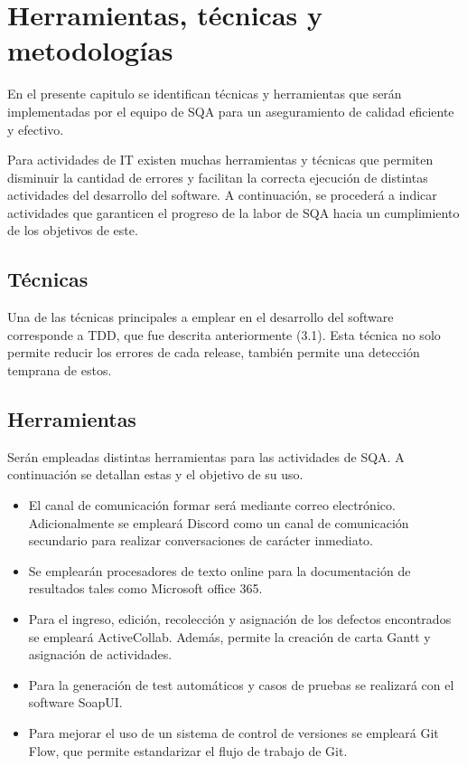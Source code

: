 
\chapter{Herramientas, técnicas y metodologías}

En el presente capitulo se identifican técnicas y herramientas que serán implementadas por el equipo de SQA para un aseguramiento de calidad eficiente y efectivo.

Para actividades de IT existen muchas herramientas y técnicas que permiten disminuir la cantidad de errores y facilitan la correcta ejecución de distintas actividades del desarrollo del software. A continuación, se procederá a indicar actividades que garanticen el progreso de la labor de SQA hacia un cumplimiento de los objetivos de este.

\section{Técnicas}

Una de las técnicas principales a emplear en el desarrollo del software corresponde a TDD, que fue descrita anteriormente (3.1). Esta técnica no solo permite reducir los errores de cada release, también permite una detección temprana de estos.

\section{Herramientas}

Serán empleadas distintas herramientas para las actividades de SQA. A continuación se detallan estas y el objetivo de su uso.

\begin{itemize}
	\item 
		El canal de comunicación formar será mediante correo electrónico. Adicionalmente se empleará Discord como un canal de comunicación secundario para realizar conversaciones de carácter inmediato.
	\item
		Se emplearán procesadores de texto online para la documentación de resultados tales como Microsoft office 365.
	\item
		Para el ingreso, edición, recolección y asignación de los defectos encontrados se empleará ActiveCollab. Además, permite la creación de carta Gantt y asignación de actividades.
	\item
		Para la generación de test automáticos y casos de pruebas se realizará con el software SoapUI.
	\item 
		Para mejorar el uso de un sistema de control de versiones se empleará Git Flow, que permite estandarizar el flujo de trabajo de Git.
\end{itemize}

